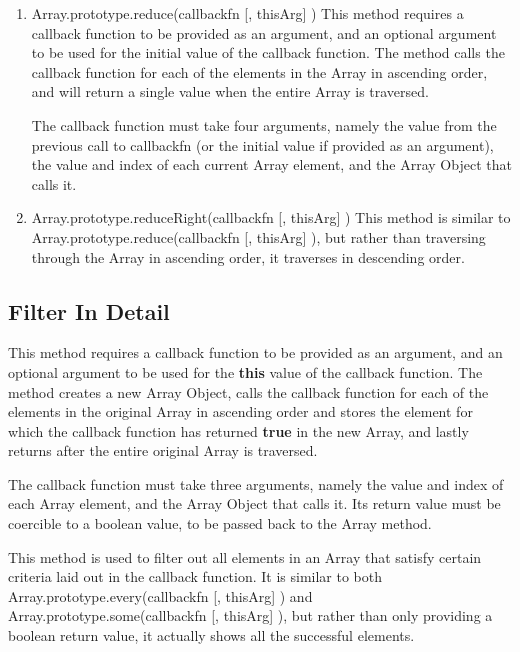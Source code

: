 \documentclass[a4paper,11pt,twoside]{report}
\begin{document}
\begin{enumerate}
\item Array.prototype.reduce(callbackfn [, thisArg] ) \newline
This method requires a callback function to be provided as an argument, and an optional argument to be used for the initial value of the callback function. The method calls the callback function for each of the elements in the Array in ascending order, and will return a single value when the entire Array is traversed. 

The callback function must take four arguments, namely the value from the previous call to callbackfn (or the initial value if provided as an argument), the value and index of each current Array element, and the Array Object that calls it. 

\item Array.prototype.reduceRight(callbackfn [, thisArg] ) \newline
This method is similar to Array.prototype.reduce(callbackfn [, thisArg] ), but rather than traversing through the Array in ascending order, it traverses in descending order.
\end{enumerate}

\subsection{Filter In Detail}\label{sec:filter}
This method requires a callback function to be provided as an argument, and an optional argument to be used for the \textbf{this} value of the callback function. The method creates a new Array Object, calls the callback function for each of the elements in the original Array in ascending order and stores the element for which the callback function has returned \textbf{true} in the new Array, and lastly returns after the entire original Array is traversed. 

The callback function must take three arguments, namely the value and index of each Array element, and the Array Object that calls it. Its return value must be coercible to a boolean value, to be passed back to the Array method.

This method is used to filter out all elements in an Array that satisfy certain criteria laid out in the callback function. It is similar to both Array.prototype.every(callbackfn [, thisArg] ) and Array.prototype.some(callbackfn [, thisArg] ), but rather than only providing a boolean return value, it actually shows all the successful elements.
\end{document}
